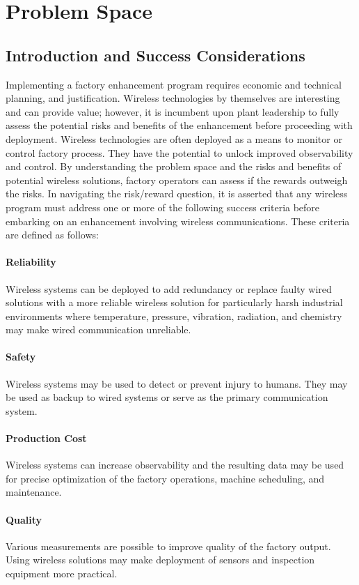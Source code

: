    \section{Problem Space}
    
    \subsection{Introduction and Success Considerations}
    Implementing a factory enhancement program requires economic and technical planning, and justification.  Wireless technologies by themselves are interesting and can provide value; however, it is incumbent upon plant leadership to fully assess the potential risks and benefits of the enhancement before proceeding with deployment. Wireless technologies are often deployed as a means to monitor or control factory process. They have the potential to unlock improved observability and control. By understanding the problem space and the risks and benefits of potential wireless solutions, factory operators can assess if the rewards outweigh the risks.  In navigating the risk/reward question, it is asserted that any wireless program must address one or more of the following success criteria before embarking on an enhancement involving wireless communications.  These criteria are defined as follows:
    
	\paragraph{Reliability} Wireless systems can be deployed to add redundancy or replace faulty wired solutions with a more reliable wireless solution for particularly harsh industrial environments where temperature, pressure, vibration, radiation, and chemistry may make wired communication unreliable.
	\paragraph{Safety} Wireless systems may be used to detect or prevent injury to humans.  They may be used as backup to wired systems or serve as the primary communication system.
	\paragraph{Production Cost} Wireless systems can increase observability and the resulting data may be used for precise optimization of the factory operations, machine scheduling, and maintenance.
	\paragraph{Quality} Various measurements are possible to improve quality of the factory output. Using wireless solutions may make deployment of sensors and inspection equipment more practical. 
